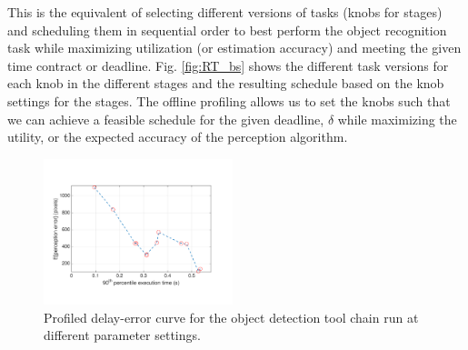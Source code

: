 
This is the equivalent of selecting different versions of tasks (knobs for stages) and scheduling them in sequential order to best perform the object recognition task while maximizing utilization (or estimation accuracy) and meeting the given time contract or deadline. Fig. \ref{fig:RT_bs} shows the different task versions for each knob in the different stages and the resulting schedule based on the knob settings for the stages. The offline profiling allows us to set the knobs such that we can achieve a feasible schedule for the given deadline, $\delta$ while maximizing the utility, or the expected accuracy of the perception algorithm. 

\begin{figure}[t]
	\centering
	\includegraphics[trim = 0 30mm 0 30mm, width=0.49\textwidth]{figures/chainErrorDelay}
	\caption{Profiled delay-error curve for the object detection tool chain run at different parameter settings.}
	\label{fig:eps_delta_toy}
\end{figure}




